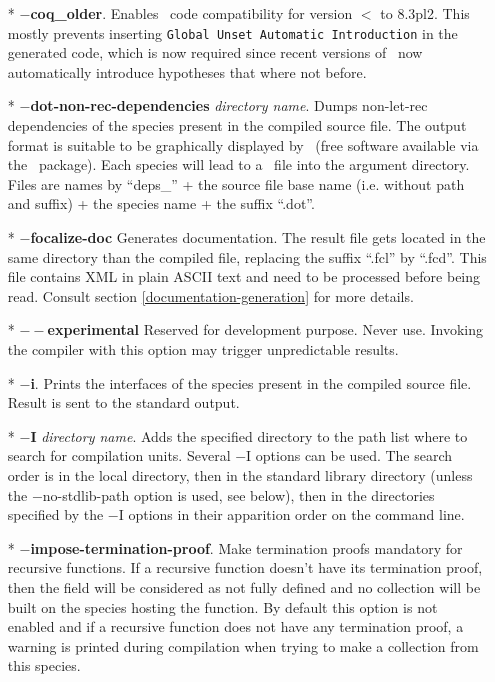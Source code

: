\begin{itemize}
  \item[*] {\bf $-$coq\_older}.
    Enables \coq\ code compatibility for version $<$ to 8.3pl2. This
    mostly prevents inserting {\tt Global Unset Automatic
      Introduction} in the generated code, which is now required since
    recent versions of \coq\ now automatically introduce hypotheses
    that where not before.
  \item[*] {\bf $-$dot-non-rec-dependencies} {\em directory name}.
    Dumps non-let-rec dependencies of the species present in the
    compiled source file. The output format is suitable to be
    graphically displayed by \dotty\ (free software available via the
    \graphviz\ package). Each species will lead to a \dotty\ file into
    the argument directory. Files are names by ``deps\_'' + the source
    file base name (i.e. without path and suffix) + the species name +
    the suffix ``.dot''.

  \item[*] {\bf $-$focalize-doc} Generates documentation. The
    result file gets located in the same directory than the compiled
    file, replacing the suffix ``.fcl'' by ``.fcd''. This file contains
    XML in plain ASCII text and need to be processed before being read.
    Consult section \ref{documentation-generation} for more details.

  \item[*] {\bf $--$experimental} Reserved for development purpose.
    Never use. Invoking the compiler with this option may trigger
    unpredictable results.

  \item[*] {\bf $-$i}. Prints the interfaces of the species present in
    the compiled source file. Result is sent to the standard output.

  \item[*] {\bf $-$I} {\em directory name}. Adds the specified
    directory to the path list where to search for
    compilation units. Several $-$I options can be used. The search order is
    in the local directory, then in the standard library directory (unless the
    $-$no-stdlib-path option is used, see below), then in the
    directories specified by the $-$I options in their apparition
    order on the command line.

  \item[*] {\bf $-$impose-termination-proof}. Make termination proofs
    mandatory for recursive functions. If a recursive function doesn't
    have its termination proof, then the field will be considered as
    not fully defined and no collection will be built on the
    species hosting the function. By default this option is not
    enabled and if a recursive function does not have any termination
    proof, a warning is printed during compilation when trying to make
    a collection from this species.


\end{itemize}

